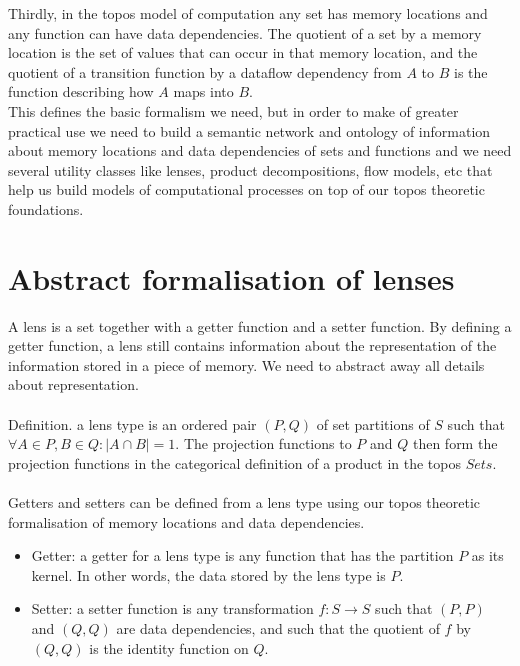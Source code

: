 \documentclass[a4paper,11pt]{report}
\begin{document}
Thirdly, in the topos model of computation any set has memory locations and any function can have data dependencies. The quotient of a set by a memory location is the set of values that can occur in that memory location, and the quotient of a transition function by a dataflow dependency from $A$ to $B$ is the function describing how $A$ maps into $B$. \\

This defines the basic formalism we need, but in order to make of greater practical use we need to build a semantic network and ontology of information about memory locations and data dependencies of sets and functions and we need several utility classes like lenses, product decompositions, flow models, etc that help us build models of computational processes on top of our topos theoretic foundations.

\newpage 

\section{Abstract formalisation of lenses}
A lens is a set together with a getter function and a setter function. By defining a getter function, a lens still contains information about the representation of the information stored in a piece of memory. We need to abstract away all details about representation.
\\ \\
Definition. a lens type is an ordered pair $(P,Q)$ of set partitions of $S$ such that $\forall A \in P, B \in Q : |A \cap B| = 1$. The projection functions to $P$ and $Q$ then form the projection functions in the categorical definition of a product in the topos $Sets$.
\\ \\ 
Getters and setters can be defined from a lens type using our topos theoretic formalisation of memory locations and data dependencies.

\begin{itemize}
  \item Getter: a getter for a lens type is any function that has the partition $P$ as its kernel. In other words, the data stored by the lens type is $P$.
  \item Setter: a setter function is any transformation $f: S \to S$ such that $(P,P)$ and $(Q,Q)$ are data dependencies, and such that the quotient of $f$ by $(Q,Q)$ is the identity function on $Q$.
\end{itemize}
\end{document}
